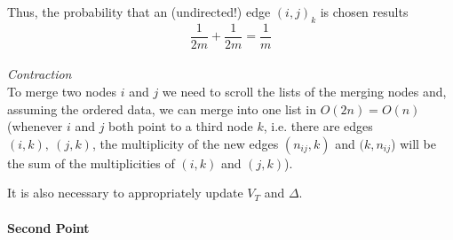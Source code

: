 \documentclass[a4paper]{article}
\begin{document}
Thus, the probability that an (undirected!) edge $(i,j)_k$ is chosen results
$$\frac{1}{2m} + \frac{1}{2m} = \frac{1}{m}$$
\\
\noindent
\textit{Contraction}\\
To merge two nodes $i$ and $j$ we need to scroll the lists of the merging nodes and, assuming the ordered data, we can merge into one list in $O(2n) = O(n)$ (whenever $i$ and $j$ both point to a third node $k$, i.e. there are edges $(i,k),\ (j,k)$, the multiplicity of the new edges $(n_{ij},k)$ and $(k, n_{ij}$) will be the sum of the multiplicities of $(i,k)$ and $(j,k)$).

It is also necessary to appropriately update $V_T$ and $\Delta$.
\\
\\

\noindent
\textbf{Second Point}
\\
\end{document}
